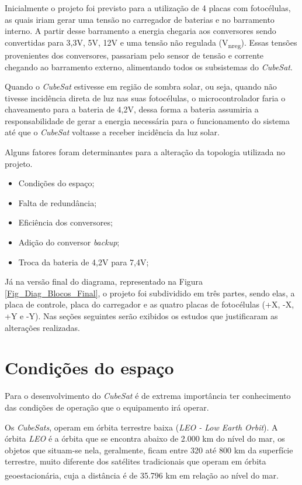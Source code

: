 \documentclass[
	12pt,				%
	openright,			%
	oneside,			%
	a4paper,			%
	english,			%
	french,				%
	spanish,			%
	brazil,				%
	oldfontcommands
	]{abntex2}
\begin{document}
	Inicialmente o projeto foi previsto para a utilização de 4 placas com fotocélulas, as quais iriam gerar uma tensão no carregador de baterias e no barramento interno. A partir desse barramento a energia chegaria aos conversores sendo convertidas para 3,3V, 5V, 12V e uma tensão não regulada (V\textsubscript{nreg}). Essas tensões provenientes dos conversores, passariam pelo sensor de tensão e corrente chegando ao barramento externo, alimentando todos os subsistemas do \textit{CubeSat}.
	
	Quando o  \textit{CubeSat} estivesse em região de sombra solar, ou seja, quando não tivesse incidência direta de luz nas suas fotocélulas, o microcontrolador faria o chaveamento para a bateria de 4,2V, dessa forma a bateria assumiria a responsabilidade de gerar a energia necessária para o funcionamento do sistema até que o \textit{CubeSat} voltasse a receber incidência da luz solar.
	
	Alguns fatores foram determinantes para a alteração da topologia utilizada no projeto.
	
	\begin{itemize}
		\item	Condições do espaço;
		\item	Falta de redundância;
		\item	Eficiência dos conversores;
		\item	Adição do conversor \textit{backup};
		\item	Troca da bateria de 4,2V para 7,4V;
	\end{itemize}

	Já na versão final do diagrama, representado na Figura \ref{Fig_Diag_Blocos_Final}, o projeto foi subdividido em três partes, sendo elas, a placa de controle, placa do carregador e as quatro placas de fotocélulas (+X, -X, +Y e -Y). Nas seções seguintes serão exibidos os estudos que justificaram as alterações realizadas.
 
\section[Condições do espaço]{Condições do espaço}
	
	Para o desenvolvimento do \textit{CubeSat} é de extrema importância ter conhecimento das condições de operação que o equipamento irá operar.
	
	Os \textit{CubeSats}, operam em órbita terrestre baixa (\textit{LEO - Low Earth Orbit}). A órbita \textit{LEO} é a órbita que se encontra abaixo de 2.000 km do nível do mar, os objetos que situam-se nela, geralmente, ficam entre 320 até 800 km da superfície terrestre, muito diferente dos satélites tradicionais que operam em órbita geoestacionária, cuja a distância é de 35.796 km em relação ao nível do mar.\textsuperscript{\cite{LEO}}\textsuperscript{\cite{GEO}}
	
\end{document}

